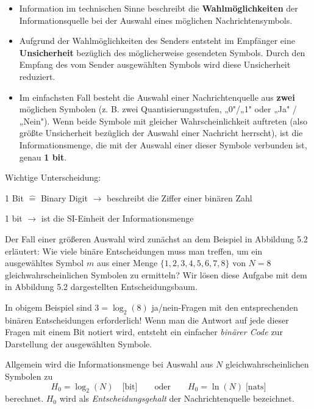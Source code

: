 \begin{itemize}
  \item Information im technischen Sinne beschreibt die \textbf{Wahlmöglichkeiten} der Informationsquelle bei der Auswahl eines möglichen Nachrichtensymbols.

  \item Aufgrund der Wahlmöglichkeiten des Senders entsteht im Empfänger eine \textbf{Unsicherheit} bezüglich des möglicherweise gesendeten Symbols. Durch den Empfang des vom Sender ausgewählten Symbols wird diese Unsicherheit reduziert.

  \item Im einfachsten Fall besteht die Auswahl einer Nachrichtenquelle aus \textbf{zwei} möglichen Symbolen (z. B. zwei Quantisierungsstufen, „0"/„1" oder „Ja" / „Nein"). Wenn beide Symbole mit gleicher Wahrscheinlichkeit auftreten (also größte Unsicherheit bezüglich der Auswahl einer Nachricht herrscht), ist die Informationsmenge, die mit der Auswahl einer dieser Symbole verbunden ist, genau \textbf{1 bit}.
\end{itemize}

Wichtige Unterscheidung:

1 Bit $\mathrel{\widehat{=}}$ Binary Digit $\rightarrow$ beschreibt die Ziffer einer binären Zahl

1 bit $\rightarrow$ ist die SI-Einheit der Informationsmenge

Der Fall einer größeren Auswahl wird zunächst an dem Beispiel in Abbildung 5.2 erläutert: Wie viele binäre Entscheidungen muss man treffen, um ein ausgewähltes Symbol $m$ aus einer Menge $\{1,2,3,4,5,6,7,8\}$ von $N = 8$ gleichwahrscheinlichen Symbolen zu ermitteln? Wir lösen diese Aufgabe mit dem in Abbildung 5.2 dargestellten Entscheidungsbaum.


In obigem Beispiel sind $3 = \log_2(8)$ ja/nein-Fragen mit den entsprechenden binären Entscheidungen erforderlich! Wenn man die Antwort auf jede dieser Fragen mit einem Bit notiert wird, entsteht ein einfacher \textit{binärer Code} zur Darstellung der ausgewählten Symbole.

\begin{definition}[Entscheidungsgehalt]
Allgemein wird die Informationsmenge bei Auswahl aus $N$ gleichwahrscheinlichen Symbolen zu
$$
H_0 = \log_2(N) \quad \text{[bit]} \qquad \text{oder} \qquad H_0 = \ln(N) \; \text{[nats]}
$$
berechnet. $H_0$ wird als \textit{Entscheidungsgehalt} der Nachrichtenquelle bezeichnet.
\end{definition}

